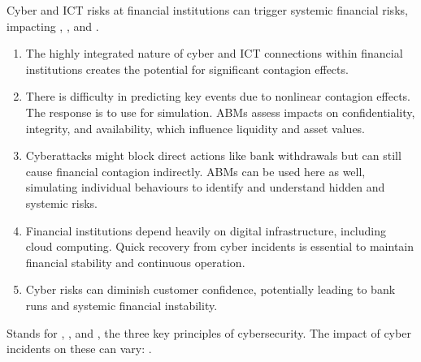 
Cyber and ICT risks at financial institutions can trigger systemic financial risks, impacting
, , and .

\begin{enumerate}
\item {} The highly integrated nature of cyber and ICT
connections within financial institutions creates the potential for significant contagion
effects.
\item {} There is difficulty in predicting key events
due to nonlinear contagion effects. The response is to use  for
simulation. ABMs assess impacts on confidentiality, integrity, and availability, which
influence liquidity and asset values.
\item {} Cyberattacks might block direct actions like bank
withdrawals but can still cause financial contagion indirectly. ABMs can be used here as well,
simulating individual behaviours to identify and understand hidden and systemic risks.
\item {} Financial institutions depend heavily on
digital infrastructure, including cloud computing. Quick recovery from cyber incidents is
essential to maintain financial stability and continuous operation.
\item {} Cyber risks can diminish customer confidence,
potentially leading to bank runs and systemic financial instability.
\end{enumerate}

\begin{cidefbox}[title={CIA triad}]
Stands for , , and , the three key
principles of cybersecurity. The impact of cyber incidents on these can vary: .
\end{cidefbox}

